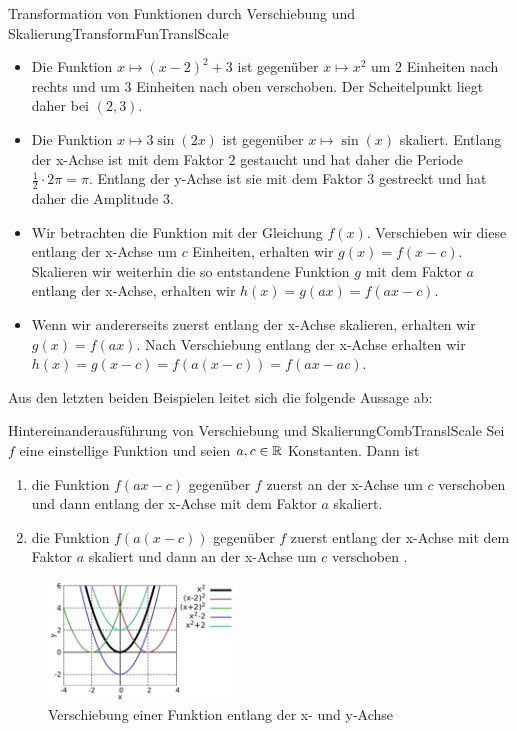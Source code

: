 \begin{example}{Transformation von Funktionen durch Verschiebung und Skalierung}{TransformFunTranslScale}
    \begin{itemize}
        \item Die Funktion $x \mapsto (x-2)^2+3$ ist gegenüber $x \mapsto x^2$ um $2$ Einheiten nach rechts und um $3$ Einheiten nach oben verschoben. Der Scheitelpunkt liegt daher bei $(2,3)$.
        \item Die Funktion $x \mapsto 3\sin(2x)$ ist gegenüber $x \mapsto \sin(x)$ skaliert. Entlang der x-Achse ist mit dem Faktor $2$ gestaucht und hat daher die Periode $\frac{1}{2}\cdot 2\pi = \pi$. Entlang der y-Achse ist sie mit dem Faktor $3$ gestreckt und hat daher die Amplitude $3$.
        \item Wir betrachten die Funktion mit der Gleichung $f(x)$. Verschieben wir diese entlang der x-Achse um $c$ Einheiten, erhalten wir $g(x) = f(x-c)$. Skalieren wir weiterhin die so entstandene Funktion $g$ mit dem Faktor $a$ entlang der x-Achse, erhalten wir $h(x) = g(ax) = f(ax-c)$.
        \item Wenn wir andererseits zuerst entlang der x-Achse skalieren, erhalten wir $g(x) = f(ax)$. Nach Verschiebung entlang der x-Achse erhalten wir $h(x) = g(x-c) = f(a(x-c)) = f(ax-ac)$.
    \end{itemize}
\end{example}

Aus den letzten beiden Beispielen leitet sich die folgende Aussage ab:

\begin{statement}{Hintereinanderausführung von Verschiebung und Skalierung}{CombTranslScale}
    Sei $f$ eine einstellige Funktion und seien $a,c\in\mathbb{R}$ Konstanten. Dann ist
    \begin{enumerate}
        \item die Funktion $f(ax-c)$ gegenüber $f$ zuerst an der x-Achse um $c$ verschoben und dann entlang der x-Achse mit dem Faktor $a$ skaliert.
        \item die Funktion $f(a(x-c))$ gegenüber $f$ zuerst entlang der x-Achse mit dem Faktor $a$ skaliert und dann an der x-Achse um $c$ verschoben .
    \end{enumerate}
\end{statement}

\begin{figure}
    \centering
    \includegraphics[width=0.45\textwidth]{./gnuplot/transform-fun-translate}
    \caption{Verschiebung einer Funktion entlang der x- und y-Achse}
    \label{fig:TransformFunTrans}
\end{figure}

